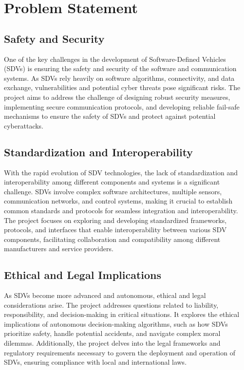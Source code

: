 \documentclass[
12pt,
oneside, 
onehalfspacing, 
nolistspacing, 
parskip, 
chapterinoneline, 
]{AASTCOMPUTER}
\begin{document}
\section{Problem Statement}
\subsection{Safety and Security}
One of the key challenges in the development of Software-Defined Vehicles (SDVs) is ensuring the safety and security of the software and communication systems. As SDVs rely heavily on software algorithms, connectivity, and data exchange, vulnerabilities and potential cyber threats pose significant risks. The project aims to address the challenge of designing robust security measures, implementing secure communication protocols, and developing reliable fail-safe mechanisms to ensure the safety of SDVs and protect against potential cyberattacks.

\subsection{Standardization and Interoperability}
With the rapid evolution of SDV technologies, the lack of standardization and interoperability among different components and systems is a significant challenge. SDVs involve complex software architectures, multiple sensors, communication networks, and control systems, making it crucial to establish common standards and protocols for seamless integration and interoperability. The project focuses on exploring and developing standardized frameworks, protocols, and interfaces that enable interoperability between various SDV components, facilitating collaboration and compatibility among different manufacturers and service providers.
\subsection{Ethical and Legal Implications}
As SDVs become more advanced and autonomous, ethical and legal considerations arise. The project addresses questions related to liability, responsibility, and decision-making in critical situations. It explores the ethical implications of autonomous decision-making algorithms, such as how SDVs prioritize safety, handle potential accidents, and navigate complex moral dilemmas. Additionally, the project delves into the legal frameworks and regulatory requirements necessary to govern the deployment and operation of SDVs, ensuring compliance with local and international laws.
\end{document}
